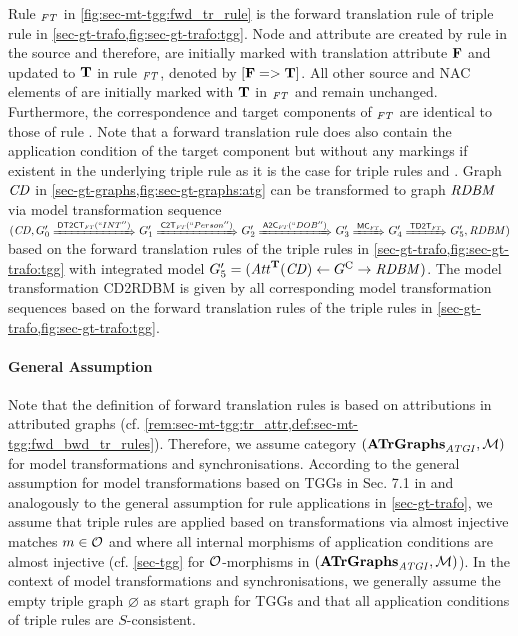 \begin{example}
\label{ex:sec-mt-tgg:fwd_mt}
Rule $_\mathit{FT}$ in \cref{fig:sec-mt-tgg:fwd_tr_rule} is the forward translation rule of triple rule  in \cref{sec-gt-trafo,fig:sec-gt-trafo:tgg}.
Node  and attribute  are created by rule  in the source and therefore, are initially marked with translation attribute $\mathbf{F}$ and updated to $\mathbf{T}$ in rule $_\mathit{FT}$, denoted by $[\mathbf{F} => \mathbf{T}]$.
All other source and NAC elements of  are initially marked with $\mathbf{T}$ in $_\mathit{FT}$ and remain unchanged.
Furthermore, the correspondence and target components of $_\mathit{FT}$ are identical to those of rule .
Note that a forward translation rule does also contain the application condition of the target component but without any markings if existent in the underlying triple rule as it is the case for triple rules  and .
Graph $\mathit{CD}$ in \cref{sec-gt-graphs,fig:sec-gt-graphs:atg} can be transformed to graph $\mathit{RDBM}$ via model transformation sequence $(\CD,G'_0 \Trans{\code{DT2CT}_\FT(``INT'')} G'_1 \Trans{\code{C2T}_\FT(``Person'')} G'_2 \Trans{\code{A2C}_\FT(``DOB'')} G'_3 \Trans{\code{MC}_\FT} G'_4 \Trans{\code{TD2T}_\FT} G'_5,\RDBM)$ based on the forward translation rules of the triple rules in \cref{sec-gt-trafo,fig:sec-gt-trafo:tgg} with integrated model $G'_5=(\mathit{Att}^\mathbf{T}(\mathit{CD}) \gets G^\mathrm{C} \to \mathit{RDBM})$.
The model transformation CD2RDBM is given by all corresponding model transformation sequences based on the forward translation rules of the triple rules in \cref{sec-gt-trafo,fig:sec-gt-trafo:tgg}.
\envEndMarker
\end{example}

\paragraph*{General Assumption}
\label{rem:sec-mt-tgg:gen_ass}
Note that the definition of forward translation rules is based on attributions in attributed graphs (cf. \cref{rem:sec-mt-tgg:tr_attr,def:sec-mt-tgg:fwd_bwd_tr_rules}).
Therefore, we assume category $(\mathbf{ATrGraphs}_\mathit{ATGI},{\cal M})$ for model transformations and synchronisations.
According to the general assumption for model transformations based on TGGs in Sec. 7.1 in \cite{FAGT2} and analogously to the general assumption for rule applications in \cref{sec-gt-trafo}, we assume that triple rules are applied based on transformations via almost injective matches $m \in {\cal O}$ and where all internal morphisms of application conditions are almost injective (cf. \cref{sec-tgg} for ${\cal O}$-morphisms in $(\mathbf{ATrGraphs}_\mathit{ATGI},{\cal M})$).
In the context of model transformations and synchronisations, we generally assume the empty triple graph $\varnothing$ as start graph for TGGs and that all application conditions of triple rules are $S$-consistent.
